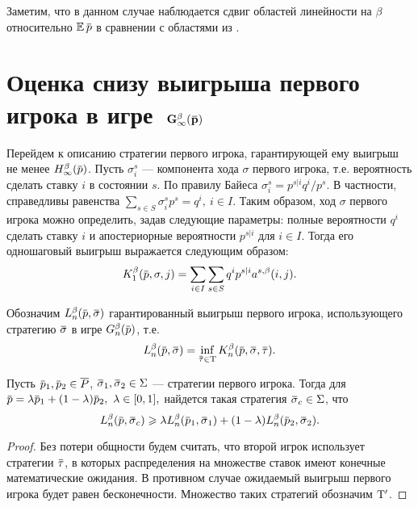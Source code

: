 {Заметим, что в данном случае наблюдается сдвиг областей линейности на $\beta$ относительно $\E \p$ в сравнении с областями из \cite{domansky11}.

\section{Оценка снизу выигрыша первого игрока в игре~$\mathbf{G^\beta_\infty(\p)}$}
\label{ch2:sec:lower-bound}

Перейдем к описанию стратегии первого игрока, гарантирующей ему выигрыш не менее $\High(\p)$.
Пусть $\sigma^s_i$ --- компонента хода $\sigma$ первого игрока, т.е. вероятность сделать ставку $i$ в состоянии $s$.
По правилу Байеса $\sigma^s_i = p^{s|i} q^i / p^s$.
В частности, справедливы равенства $\sum_{s \in S} \sigma^s_i p^s = q^i,\ i \in I$.
Таким образом, ход $\sigma$ первого игрока можно определить, задав следующие параметры: полные вероятности $q^i$ сделать ставку $i$ и апостериорные вероятности $p^{s|i}$ для $i \in I$.
Тогда его одношаговый выигрыш выражается следующим образом:
\begin{equation}
  \label{ch2:lower-bound:eq:K1(q,pi)}
  \K[1](\p, \sigma, j) = \sum_{i \in I} \sum_{s \in S} q^i p^{s|i} \as(i, j).
\end{equation}

Обозначим $\Low[n](\p, \sigmav)$ гарантированный выигрыш первого игрока, использующего стратегию $\sigmav$ в игре $\theG[n](\p)$, т.е.
\[
  \Low[n](\p, \sigmav) = \inf_{\tauv \in \Tau} \K[n](\p, \sigmav, \tauv).
\]

\begin{lemma}
  \label{ch2:lower-bound:lemma:convex-combination}
  Пусть $\p_1, \p_2 \in \MM$, $\sigmav_1, \sigmav_2 \in \Sigma$ --- стратегии первого игрока.
  Тогда для $\p = \lambda \p_1 + (1-\lambda) \p_2,\ \lambda \in [0, 1],$ найдется такая стратегия $\sigmav_c \in \Sigma$, что
  \[
    \Low[n](\p, \sigmav_c) \geqslant
    \lambda \Low[n](\p_1, \sigmav_1) + (1-\lambda) \Low[n](\p_2, \sigmav_2).
  \]
\end{lemma}
\begin{proof}
  Без потери общности будем считать, что второй игрок использует стратегии $\tauv$, в которых распределения на множестве ставок имеют конечные математические ожидания.
  В противном случае ожидаемый выигрыш первого игрока будет равен бесконечности.
  Множество таких стратегий обозначим $\mathrm{T}'$.
  

\end{proof}}

